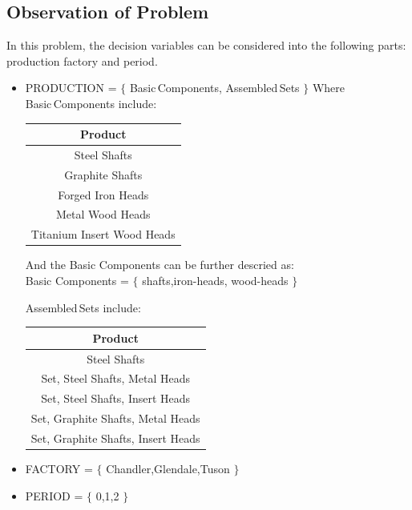\documentclass[12pt]{article}
\begin{document}
\subsection{Observation of Problem}
In this problem, the decision variables can be considered into the following parts: production factory and period.
\begin{itemize}

    \item PRODUCTION = $\{$
        Basic\,Components, Assembled\,Sets
    $\}$
    Where \\Basic\,Components include:
\begin{center}
\begin{tabular}{ c }
\hline
\textbf{Product} \\
\hline
 Steel Shafts \\
 Graphite Shafts \\
 Forged Iron Heads \\
 Metal Wood Heads \\
 Titanium Insert Wood Heads \\
\hline
\end{tabular}
\vspace{5mm}
\end{center}

\noindent
And the Basic Components can be further descried as:\\
Basic Components = $\{$
        shafts,iron-heads, wood-heads
    $\}$
    
\noindent
    Assembled\,Sets include:

\begin{center}
\begin{tabular}{ c }
\hline
\textbf{Product} \\
\hline
 Steel Shafts \\
 Set, Steel Shafts, Metal Heads \\
 Set, Steel Shafts, Insert Heads \\
 Set, Graphite Shafts, Metal Heads \\
 Set, Graphite Shafts, Insert Heads \\
\hline
\end{tabular}
\vspace{5mm}
\end{center}


    \item FACTORY = $\{$
        Chandler,Glendale,Tuson
    $\}$
    \item PERIOD = $\{$
        0,1,2
    $\}$
    

\end{itemize}
\end{document}
